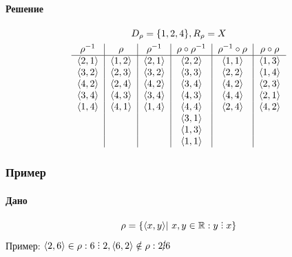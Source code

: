 \documentclass{article}
\DeclareRobustCommand{\divby}{\mathrel{\vbox{\baselineskip.65ex\lineskiplimit0pt\hbox{.}\hbox{.}\hbox{.}}}}
\begin{document}
\paragraph{Решение}
\begin{gather*}
    D_{\rho} = \{1, 2, 4\}, R_{\rho} = X \\
    \begin{tabular}{c|c|c|c|c|c}
        $\rho^{-1}$ & $\rho$ & $\rho^{-1}$ & $\rho \circ \rho^{-1}$ & $\rho^{-1} \circ \rho$ & $\rho \circ \rho$ \\
        \hline
        $\langle 2, 1 \rangle$ & $\langle 1, 2 \rangle$ & $\langle 2, 1 \rangle$ & $\langle 2, 2 \rangle$ & $\langle 1, 1 \rangle$ & $\langle 1, 3 \rangle$ \\
        $\langle 3, 2 \rangle$ & $\langle 2, 3 \rangle$ & $\langle 3, 2 \rangle$ & $\langle 3, 3 \rangle$ & $\langle 2, 2 \rangle$ & $\langle 1, 4 \rangle$ \\
        $\langle 4, 2 \rangle$ & $\langle 2, 4 \rangle$ & $\langle 4, 2 \rangle$ & $\langle 3, 4 \rangle$ & $\langle 4, 2 \rangle$ & $\langle 2, 3 \rangle$ \\
        $\langle 3, 4 \rangle$ & $\langle 4, 3 \rangle$ & $\langle 3, 4 \rangle$ & $\langle 4, 3 \rangle$ & $\langle 4, 4 \rangle$ & $\langle 2, 1 \rangle$ \\
        $\langle 1, 4 \rangle$ & $\langle 4, 1 \rangle$ & $\langle 1, 4 \rangle$ & $\langle 4, 4 \rangle$ & $\langle 2, 4 \rangle$ & $\langle 4, 2 \rangle$ \\
                               &                        &                        & $\langle 3, 1 \rangle$ &                        &                        \\
                               &                        &                        & $\langle 1, 3 \rangle$ &                        &                        \\
                               &                        &                        & $\langle 1, 1 \rangle$ &                        &       
    \end{tabular}
\end{gather*}

\subsubsection{Пример}
\paragraph{Дано}
\[
    \rho = \{\langle x, y \rangle |~x, y \in \mathbb{R}: y \divby x\} 
\]
Пример: $\langle 2, 6 \rangle \in \rho: 6 \divby 2, \langle 6, 2 \rangle \notin \rho: 2 \cancel{\divby} 6$
\end{document}
